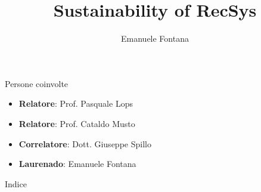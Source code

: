 \documentclass[aspectratio=169,xcolor=dvipsnames, t]{beamer}
\title[full title]{Sustainability of RecSys}
\author{Emanuele Fontana}
\institute[]{Universitàa degli Studi di Bari Aldo Moro}
\date{}
\begin{document}
\maketitlepage
\begin{frame}[t]{Persone coinvolte}
    \begin{itemize}
        \item \textbf{Relatore}: Prof. Pasquale Lops
        \item \textbf{Relatore}: Prof. Cataldo Musto
        \item \textbf{Correlatore}: Dott. Giuseppe Spillo
        \item \textbf{Laurenado}: Emanuele Fontana
    \end{itemize}
\end{frame}



\begin{frame}[t]{Indice}
    \tableofcontents
\end{frame}







\makefinalpage
\end{document}

